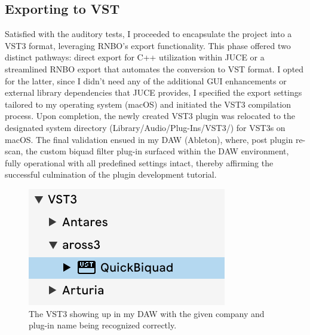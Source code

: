 \documentclass[10pt,twocolumn]{article}
\begin{document}
\subsection{Exporting to VST}
Satisfied with the auditory tests, I proceeded to encapsulate the project into a VST3 format, leveraging RNBO's export functionality. This phase offered two distinct pathways: direct export for C++ utilization within JUCE or a streamlined RNBO export that automates the conversion to VST format. I opted for the latter, since I didn't need any of the additional GUI enhancements or external library dependencies that JUCE provides, I specified the export settings tailored to my operating system (macOS) and initiated the VST3 compilation process. Upon completion, the newly created VST3 plugin was relocated to the designated system directory (Library/Audio/Plug-Ins/VST3/) for VST3s on macOS. The final validation ensued in my DAW (Ableton), where, post plugin re-scan, the custom biquad filter plug-in surfaced within the DAW environment, fully operational with all predefined settings intact, thereby affirming the successful culmination of the plugin development tutorial.

\begin{figure}[htbp]
  \centering
  \includegraphics[width=0.8\linewidth]{vst.png}
  \caption{The VST3 showing up in my DAW with the given company and plug-in name being recognized correctly.}
  \label{fig:vstdaw}
\end{figure}
\end{document}
